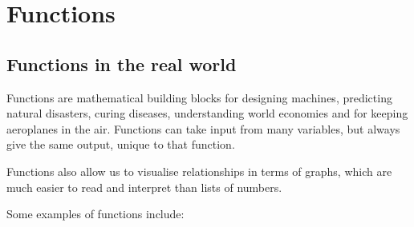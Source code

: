 
\chapter{Functions}
\setcounter{figure}{0}
\setcounter{subfigure}{0}

\section{Functions in the real world}
Functions are mathematical building blocks for designing machines, predicting natural disasters, curing diseases, understanding world economies and for keeping aeroplanes in the air. Functions can take input from many variables, but always give the same output, unique to that function. 
\par 
Functions also allow us to visualise relationships in terms of graphs, which are much easier to read and interpret than lists of numbers. 
\par
Some examples of functions include:

